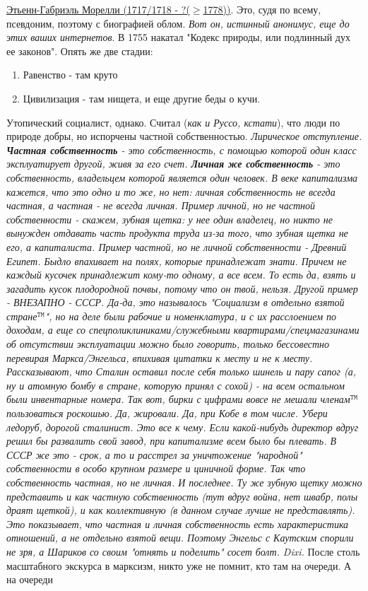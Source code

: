 \underline{Этьенн-Габриэль Морелли (1717/1718 - ?($\ge$1778))}. Это, судя по всему, псевдоним, поэтому с биографией облом. \textit{Вот он, истинный анонимус, еще до этих ваших интернетов}.
В 1755 накатал "Кодекс природы, или подлинный дух ее законов". Опять же две стадии:
\begin{enumerate}
\item Равенство - там круто
\item Цивилизация - там нищета, и еще другие беды о кучи.
\end{enumerate}
Утопический социалист, однако. Считал (\textit{как и Руссо, кстати}), что люди по природе добры, но испорчены частной собственностью. 
\textit{Лирическое отступление. \textbf{Частная собственность} - это собственность, с помощью которой один класс эксплуатирует другой, живя за его счет. \textbf{Личная же собственность} - это собственность, владельцем которой является один человек. В веке капитализма кажется, что это одно и то же, но нет: личная собственность не всегда частная, а частная - не всегда личная. Пример личной, но не частной собственности - скажем, зубная щетка: у нее один владелец, но никто не вынужден отдавать часть продукта труда из-за того, что зубная щетка не его, а капиталиста. Пример частной, но не личной собственности - Древний Египет. Быдло впахивает на полях, которые принадлежат знати. Причем не каждый кусочек принадлежит кому-то одному, а все всем. То есть да, взять и загадить кусок плодородной почвы, потому что он твой, нельзя. Другой пример  - ВНЕЗАПНО - СССР. Да-да, это называлось "Социализм в отдельно взятой стране${}^\mathtt{TM}$", но на деле были рабочие и номенклатура, и с их расслоением по доходам, а еще со спецполиклиниками/служебными квартирами/спецмагазинами об отсутствии эксплуатации можно было говорить, только бессовестно перевирая Маркса/Энгельса, впихивая цитатки к месту и не к месту. Рассказывают, что Сталин оставил после себя только шинель и пару сапог (а, ну и атомную бомбу в стране, которую принял с сохой) - на всем остальном были инвентарные номера. Так вот, бирки с цифрами вовсе не мешали членам${}^\mathtt{TM}$ пользоваться роскошью. Да, жировали. Да, при Кобе в том числе. Убери ледоруб, дорогой сталинист. Это все к чему. Если какой-нибудь директор вдруг решил бы развалить свой завод, при капитализме всем было бы плевать. В СССР же это - срок, а то и расстрел за уничтожение "народной" собственности в особо крупном размере и циничной форме. Так что собственность частная, но не личная. И последнее. Ту же зубную щетку можно представить и как частную собственность (тут вдруг война, нет швабр, полы драят щеткой), и как коллективную (в данном случае лучше не представлять). Это показывает, что частная и личная собственность есть характеристика отношений, а не отдельно взятой вещи. Поэтому Энгельс с Каутским спорили не зря, а Шариков со своим "отнять и поделить" сосет болт. Dixi. 
} После столь масштабного экскурса в марксизм, никто уже не помнит, кто там на очереди. А на очереди

